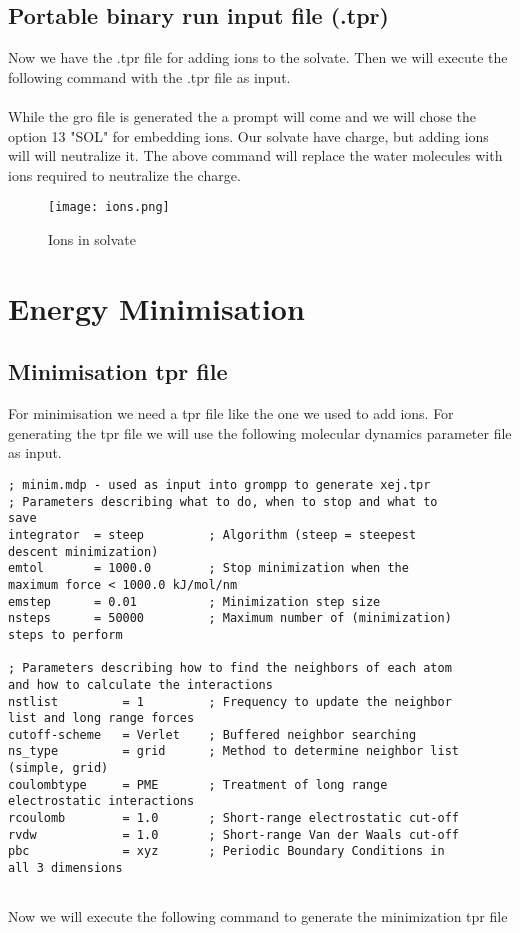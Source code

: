 \subsection{Portable binary run input file (.tpr)}

Now we have the .tpr file for adding ions to the solvate. Then we will execute the following command with the .tpr file as input.\\

\noindent{}\\

While the gro file is generated the a prompt will come and we will chose the option 13 "SOL" for embedding ions. Our solvate have charge, but adding ions will will neutralize it. The above command will replace the water molecules with ions required to neutralize the charge.
\begin{figure}[h]
    \centering
    \texttt{[image: ions.png]}
    \caption{Ions in solvate}
    
\end{figure}

\section{Energy Minimisation}
\subsection{Minimisation tpr file}

For minimisation we need a tpr file like the one we used to add ions. For generating the tpr file we will use the following molecular dynamics parameter file as input.

\begin{verbatim}
; minim.mdp - used as input into grompp to generate xej.tpr
; Parameters describing what to do, when to stop and what to 
save
integrator  = steep         ; Algorithm (steep = steepest 
descent minimization)
emtol       = 1000.0        ; Stop minimization when the 
maximum force < 1000.0 kJ/mol/nm
emstep      = 0.01          ; Minimization step size
nsteps      = 50000         ; Maximum number of (minimization) 
steps to perform

; Parameters describing how to find the neighbors of each atom 
and how to calculate the interactions
nstlist         = 1         ; Frequency to update the neighbor 
list and long range forces
cutoff-scheme   = Verlet    ; Buffered neighbor searching
ns_type         = grid      ; Method to determine neighbor list 
(simple, grid)
coulombtype     = PME       ; Treatment of long range 
electrostatic interactions
rcoulomb        = 1.0       ; Short-range electrostatic cut-off
rvdw            = 1.0       ; Short-range Van der Waals cut-off
pbc             = xyz       ; Periodic Boundary Conditions in 
all 3 dimensions
    
\end{verbatim}

Now we will execute the following command to generate the minimization tpr file\\

\noindent{}
